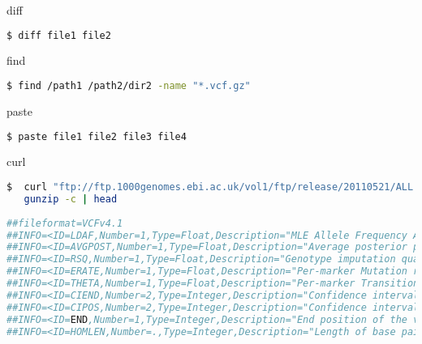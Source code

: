 \documentclass{beamer}
\begin{document}
\begin{frame}[fragile]
 \begin{center}
    \huge{diff}\\
    \end{center}
\begin{lstlisting}[language=bash]
$ diff file1 file2
\end{lstlisting}
\end{frame}

\begin{frame}[fragile]
 \begin{center}
    \huge{find}\\
    \end{center}
\begin{lstlisting}[language=bash]
$ find /path1 /path2/dir2 -name "*.vcf.gz"
\end{lstlisting}
\end{frame}

\begin{frame}[fragile]
 \begin{center}
    \huge{paste}\\
    \end{center}
\begin{lstlisting}[language=bash]
$ paste file1 file2 file3 file4
\end{lstlisting}
\end{frame}

\begin{frame}[fragile]
 \begin{center}
    \huge{curl}\\
    \end{center}
\begin{lstlisting}[language=bash]
$  curl "ftp://ftp.1000genomes.ebi.ac.uk/vol1/ftp/release/20110521/ALL.wgs.phase1_release_v3.20101123.snps_indels_sv.sites.vcf.gz" |\
   gunzip -c | head
   
##fileformat=VCFv4.1
##INFO=<ID=LDAF,Number=1,Type=Float,Description="MLE Allele Frequency Accounting for LD">
##INFO=<ID=AVGPOST,Number=1,Type=Float,Description="Average posterior probability from MaCH/Thunder">
##INFO=<ID=RSQ,Number=1,Type=Float,Description="Genotype imputation quality from MaCH/Thunder">
##INFO=<ID=ERATE,Number=1,Type=Float,Description="Per-marker Mutation rate from MaCH/Thunder">
##INFO=<ID=THETA,Number=1,Type=Float,Description="Per-marker Transition rate from MaCH/Thunder">
##INFO=<ID=CIEND,Number=2,Type=Integer,Description="Confidence interval around END for imprecise variants">
##INFO=<ID=CIPOS,Number=2,Type=Integer,Description="Confidence interval around POS for imprecise variants">
##INFO=<ID=END,Number=1,Type=Integer,Description="End position of the variant described in this record">
##INFO=<ID=HOMLEN,Number=.,Type=Integer,Description="Length of base pair identical micro-homology at event breakpoints">
\end{lstlisting}
\end{frame}
\end{document}
